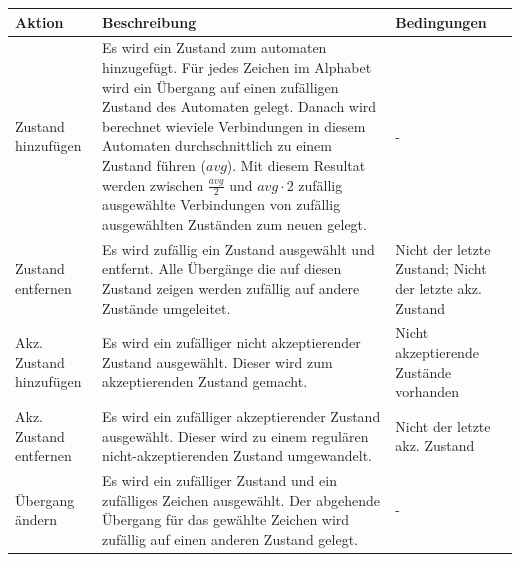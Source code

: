 \begin{center}
  \begin{tabular}{| l | p{7cm} | p{4cm} |}
    \hline
    \textbf{Aktion} &  \textbf{Beschreibung} & \textbf{Bedingungen}\\
    \hline
    Zustand hinzufügen 
    & Es wird ein Zustand zum automaten hinzugefügt. Für jedes Zeichen im Alphabet wird ein Übergang auf einen zufälligen Zustand des Automaten gelegt. Danach wird berechnet wieviele Verbindungen in diesem Automaten durchschnittlich zu einem Zustand führen ($avg$). Mit diesem Resultat werden zwischen $\frac{avg}{2}$ und $avg \cdot 2$ zufällig ausgewählte Verbindungen von zufällig ausgewählten Zuständen zum neuen gelegt.
    & - \\
    \hline
    Zustand entfernen
    & Es wird zufällig ein Zustand ausgewählt und entfernt. Alle Übergänge die auf diesen Zustand zeigen werden zufällig auf andere Zustände umgeleitet.
    & Nicht der letzte Zustand; Nicht der letzte akz. Zustand \\
    \hline
    Akz. Zustand hinzufügen
    & Es wird ein zufälliger nicht akzeptierender Zustand ausgewählt. Dieser wird zum akzeptierenden Zustand gemacht.
    & Nicht akzeptierende Zustände vorhanden \\
    \hline
    Akz. Zustand entfernen
    & Es wird ein zufälliger akzeptierender Zustand ausgewählt. Dieser wird zu einem regulären nicht-akzeptierenden Zustand umgewandelt.
    & Nicht der letzte akz. Zustand \\
    \hline
    Übergang ändern
    & Es wird ein zufälliger Zustand und ein zufälliges Zeichen ausgewählt. Der abgehende Übergang für das gewählte Zeichen wird zufällig auf einen anderen Zustand gelegt.
    & - \\
    \hline 
  \end{tabular}
\end{center}

